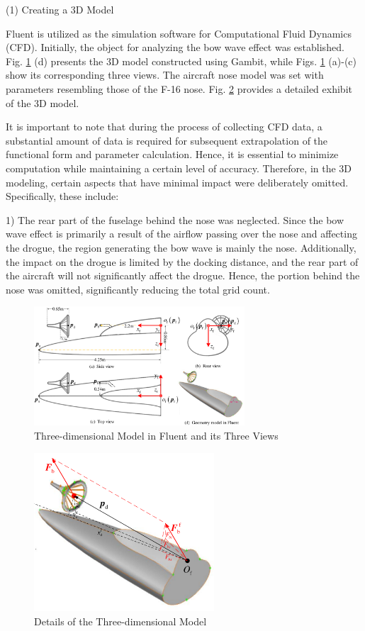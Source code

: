 (1) Creating a 3D Model

Fluent is utilized as the simulation software for Computational Fluid Dynamics (CFD). Initially, the object for analyzing the bow wave effect was established. Fig. \ref{fig4.11} (d) presents the 3D model constructed using Gambit, while Figs. \ref{fig4.11} (a)-(c) show its corresponding three views. The aircraft nose model was set with parameters resembling those of the F-16 nose. Fig. \ref{fig4.12} provides a detailed exhibit of the 3D model.

It is important to note that during the process of collecting CFD data, a substantial amount of data is required for subsequent extrapolation of the functional form and parameter calculation. Hence, it is essential to minimize computation while maintaining a certain level of accuracy. Therefore, in the 3D modeling, certain aspects that have minimal impact were deliberately omitted. Specifically, these include:

1) The rear part of the fuselage behind the nose was neglected. Since the bow wave effect is primarily a result of the airflow passing over the nose and affecting the drogue, the region generating the bow wave is mainly the nose. Additionally, the impact on the drogue is limited by the docking distance, and the rear part of the aircraft will not significantly affect the drogue. Hence, the portion behind the nose was omitted, significantly reducing the total grid count.
\begin{figure}[th]
	\centering
	\includegraphics[width=0.7\textwidth]{Figures/Figs_Ch4/fig14.pdf}
	\caption{Three-dimensional Model in Fluent and its Three Views}\label{fig4.11}
\end{figure}
\begin{figure}[th]
	\centering
	\includegraphics[width=0.6\textwidth]{Figures/Figs_Ch4/fig15.pdf}
	\caption{Details of the Three-dimensional Model}\label{fig4.12}
\end{figure}

